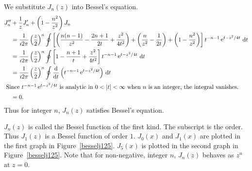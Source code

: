 We substitute $J_n(z)$ into Bessel's equation.
\begin{align*}
  J_n'' &+ \frac{1}{z} J_n' + \left(1 - \frac{n^2}{z^2}\right) J_n 
  \\
  &= \frac{1}{\imath 2 \pi} \left(\frac{z}{2}\right)^n \oint \left[
    \left(\frac{n (n - 1)}{z^2} - \frac{2 n + 1}{2 t} 
      + \frac{z^2}{4 t^2}\right)
    + \left(\frac{n}{z^2} - \frac{1}{2 t} \right)
    + \left( 1 - \frac{n^2}{z^2} \right) \right]
  t^{-n-1} \mathop{\mathrm{e}}\nolimits^{t - z^2 / 4 t}\,\mathrm{d} t 
  \\
  &= \frac{1}{\imath 2 \pi} \left(\frac{z}{2}\right)^n \oint \left[
    1 - \frac{n + 1}{t} + \frac{z^2}{4 t^2} \right]
  t^{-n-1} \mathop{\mathrm{e}}\nolimits^{t - z^2 / 4 t}\,\mathrm{d} t 
  \\
  &= \frac{1}{\imath 2 \pi} \left(\frac{z}{2}\right)^n \oint \frac{\mathrm{d}}{\mathrm{d} t}
  \left( t^{-n-1} \mathop{\mathrm{e}}\nolimits^{t - z^2 / 4 t} \right)\,\mathrm{d} t 
  \\
  \intertext{ Since $t^{-n-1} \mathop{\mathrm{e}}\nolimits^{t-z^2/4t}$ is analytic in $0 < |t| < \infty$
    when $n$ is an integer, the integral vanishes.}
  &= 0.
\end{align*}
Thus for integer $n$, $J_n(z)$ satisfies Bessel's equation.



$J_n(z)$ is called the Bessel function of the first kind.  The subscript is
the order.  Thus $J_1(z)$ is a Bessel function of order $1$.
$J_0(x)$ and $J_1(x)$ are plotted in the first graph in 
Figure~\ref{besselj125}.  $J_5(x)$
is plotted in the second graph in Figure~\ref{besselj125}.  
Note that for non-negative, integer
$n$, $J_n(z)$ behaves as $z^n$ at $z = 0$.

